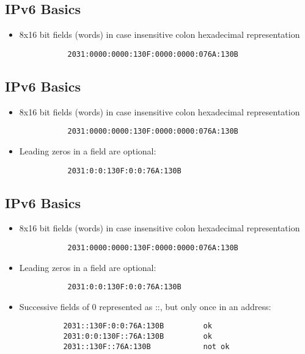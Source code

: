 \documentclass[xga]{xdvislides}
\begin{document}
\subsection{IPv6 Basics}
\begin{itemize}
	\item 8x16 bit fields (words) in case insensitive colon hexadecimal
		representation
\begin{verbatim}
           2031:0000:0000:130F:0000:0000:076A:130B
\end{verbatim}
\end{itemize}

\subsection{IPv6 Basics}
\begin{itemize}
	\item 8x16 bit fields (words) in case insensitive colon hexadecimal
		representation
\begin{verbatim}
           2031:0000:0000:130F:0000:0000:076A:130B
\end{verbatim}
	\item Leading zeros in a field are optional:
\begin{verbatim}
           2031:0:0:130F:0:0:76A:130B
\end{verbatim}
\end{itemize}

\subsection{IPv6 Basics}
\begin{itemize}
	\item 8x16 bit fields (words) in case insensitive colon hexadecimal
		representation
\begin{verbatim}
           2031:0000:0000:130F:0000:0000:076A:130B
\end{verbatim}
	\item Leading zeros in a field are optional:
\begin{verbatim}
           2031:0:0:130F:0:0:76A:130B
\end{verbatim}
	\item Successive fields of 0 represented as ::, but only once in
			an address:
\begin{verbatim}
          2031::130F:0:0:76A:130B         ok
          2031:0:0:130F::76A:130B         ok
          2031::130F::76A:130B            not ok
\end{verbatim}
\end{itemize}
\end{document}
